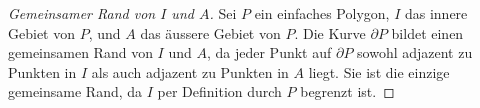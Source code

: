 \begin{proof}[Gemeinsamer Rand von $I$ und $A$\label{jordan:beweis:gemeinsamer_rand_innen_aussen}]
    Sei $P$ ein einfaches Polygon, $I$ das innere Gebiet von $P$, und $A$ das äussere Gebiet von $P$.
    Die Kurve $\partial P$ bildet einen gemeinsamen Rand von $I$ und $A$, da jeder Punkt auf $\partial P$ sowohl adjazent zu Punkten in $I$ als auch adjazent zu Punkten in $A$ liegt.
    Sie ist die einzige gemeinsame Rand, da $I$ per Definition durch $P$ begrenzt ist.
\end{proof}